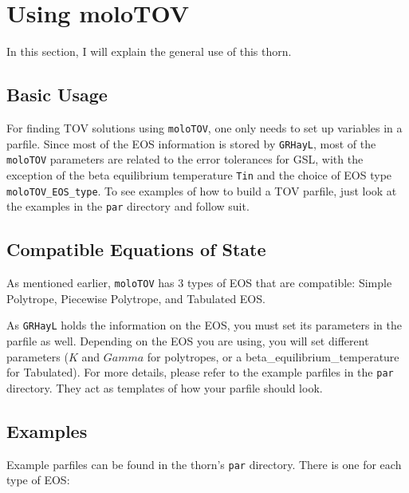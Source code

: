 \section{Using moloTOV}

In this section, I will explain the general use of this thorn. 

\subsection{Basic Usage}

For finding TOV solutions using {\tt moloTOV}, one only needs to set up variables in a parfile. Since most of the EOS information is stored by {\tt GRHayL}, most of the {\tt moloTOV} parameters are related to the error tolerances for GSL, with the exception of the beta equilibrium temperature {\tt Tin} and the choice of EOS type {\tt moloTOV\_EOS\_type}. To see examples of how to build a TOV parfile, just look at the examples in the {\tt par} directory and follow suit.

\subsection{Compatible Equations of State}

As mentioned earlier, {\tt moloTOV} has 3 types of EOS that are compatible: Simple Polytrope, Piecewise Polytrope, and Tabulated EOS.

As {\tt GRHayL}\cite{GRHayL} holds the information on the EOS, you must set its parameters in the parfile as well. Depending on the EOS you are using, you will set different parameters ($K$ and $Gamma$ for polytropes, or a beta_equilibrium_temperature for Tabulated). For more details, please refer to the example parfiles in the {\tt par} directory. They act as templates of how your parfile should look.

\subsection{Examples}

Example parfiles can be found in the thorn's {\tt par} directory. There is one for each type of EOS:

